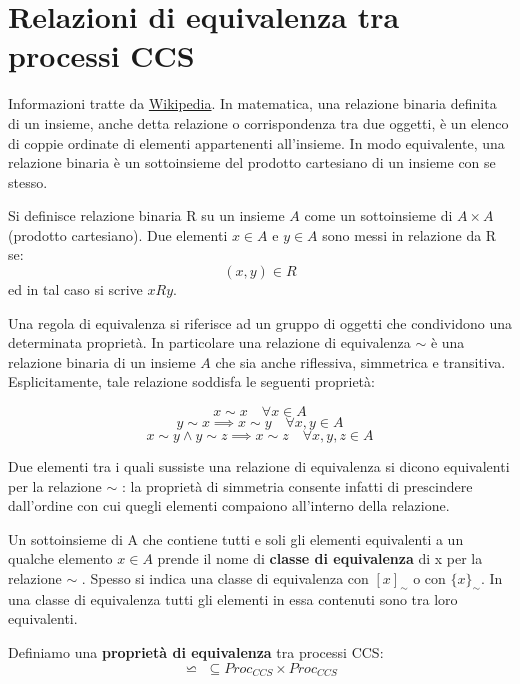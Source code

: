 \section{Relazioni di equivalenza tra processi CCS}
Informazioni tratte da \href{https://it.wikipedia.org/wiki/Relazione_di_equivalenza}{Wikipedia}.
In matematica, una relazione binaria definita di un insieme, anche detta relazione o corrispondenza tra due oggetti, è un elenco di coppie ordinate di elementi appartenenti all'insieme. In modo equivalente, una relazione binaria è un sottoinsieme del prodotto cartesiano di un insieme con se stesso. 
\begin{definizione}
Si definisce relazione binaria R su un insieme $A$ come un sottoinsieme di $A\times A$ (prodotto cartesiano). Due elementi $x\in A$ e $y\in A$ sono messi in relazione da R se:
    \[(x,y)\in R\]
ed in tal caso si scrive $xRy$. 
\end{definizione}
\begin{definizione}
  Una regola di equivalenza si riferisce ad un gruppo di oggetti che condividono una determinata proprietà. In particolare una relazione di equivalenza $\sim$ è una relazione binaria di un insieme $A$ che sia anche riflessiva, simmetrica e transitiva. Esplicitamente, tale relazione soddisfa le seguenti proprietà:

    \[x\sim x\quad \forall x\in A\]
    \[y \sim x \implies x \sim y \quad \forall x,y\in A\]
    \[x \sim y \land y \sim z \implies x \sim z \quad \forall x,y,z\in A\]
\begin{nota}
Due elementi tra i quali sussiste una relazione di equivalenza si dicono equivalenti per la relazione $ \sim$ : la proprietà di simmetria consente infatti di prescindere dall'ordine con cui quegli elementi compaiono all'interno della relazione.
\end{nota}
\begin{corollario}
 Un sottoinsieme di A  che contiene tutti e soli gli elementi equivalenti a un qualche elemento $x\in A$ prende il nome di \textbf{classe di equivalenza} di x per la relazione $\sim$ . Spesso si indica una classe di equivalenza con $[x]_{\sim }$ o con $\{x\}_{\sim }$. In una classe di equivalenza tutti gli elementi in essa contenuti sono tra loro equivalenti. 
\end{corollario}
\end{definizione}
\begin{definizione}
  Definiamo una \textbf{proprietà di equivalenza} tra processi CCS:
  \[\backsimeq \,\,\subseteq  Proc_{CCS}\times  Proc_{CCS}\]
\end{definizione}
